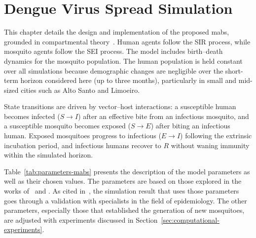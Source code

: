 \chapter{Dengue Virus Spread Simulation}\label{chp:dengue-virus-spread-simulation}

This chapter details the design and implementation of the proposed \gls{mabs}, grounded in compartmental theory~\citep{amaku:2014}. Human agents follow the SIR process, while mosquito agents follow the SEI process. The model includes birth–death dynamics for the mosquito population. The human population is held constant over all simulations because demographic changes are negligible over the short-term horizon considered here (up to three months), particularly in small and mid-sized cities such as Alto Santo and Limoeiro.

State transitions are driven by vector–host interactions: a susceptible human becomes infected ($S\!\to\!I$) after an effective bite from an infectious mosquito, and a susceptible mosquito becomes exposed ($S\!\to\!E$) after biting an infectious human. Exposed mosquitoes progress to infectious ($E\!\to\!I$) following the extrinsic incubation period, and infectious humans recover to $R$ without waning immunity within the simulated horizon.


Table~\ref{tab:parameters-mabs} presents the description of the model parameters as well as their chosen values. The parameters are based on those explored in the works of~\cite{da-silva:2020} and \cite{dwivedi:2022}. As cited in~\cite{da-silva:2020}, the simulation result that uses those parameters goes through a validation with specialists in the field of epidemiology. The other parameters, especially those that established the generation of new mosquitoes, are adjusted with experiments discussed in Section~\ref{sec:computational-experiments}.

